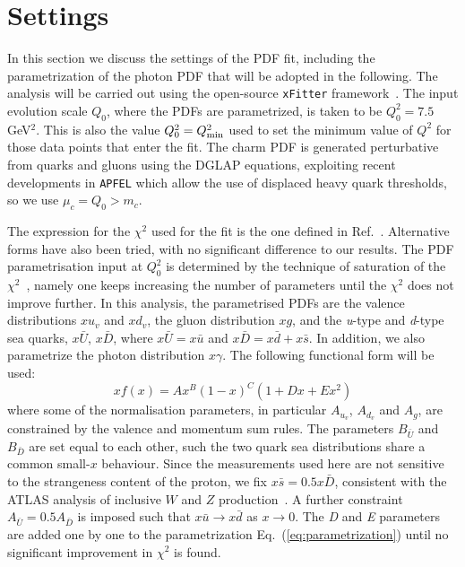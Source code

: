 \section{Settings}
\label{sec:fitsettings}

In this section we discuss the settings of
the PDF fit, including the parametrization of the photon PDF
that will be adopted in the following.
%
The analysis will be carried out using the open-source
{\tt xFitter} framework~\cite{Alekhin:2014irh}.
%
The input evolution scale $Q_0$, where the PDFs
are parametrized, is taken to be $Q^2_0 = 7.5~$GeV$^2$.
%
This is also the value $Q^2_0=Q^2_{\rm min}$ used to set the
minimum value of $Q^2$ for those data points that enter the fit.
%
The charm PDF is generated perturbative from quarks and gluons
using the DGLAP equations, exploiting recent developments
in {\tt APFEL} which allow the use of displaced heavy quark
thresholds, so we use $\mu_c=Q_0 > m_c$.

The  expression for the $\chi^2$ used for the fit is the one
defined in Ref.~\cite{h1chisqdef}.
%
Alternative forms have also been tried,
with no significant difference to our results.
% 
The PDF parametrisation input at $Q^2_0$ is determined by the technique of saturation of the $\chi^{2}$~\cite{h1chisqsat}, namely one keeps increasing
the number of parameters until the $\chi^{2}$ does not improve further.
%
In this analysis,
the parametrised PDFs are the valence distributions $xu_{v}$ and $xd_{v}$, the gluon distribution $xg$, and the \textit{u}-type and \textit{d}-type sea quarks, $x\bar{U}$, $x\bar{D}$, where $x\bar{U} = x\bar{u}$ and $x\bar{D} = x\bar{d} + x\bar{s}$.
%
In addition, we also parametrize the photon distribution $x\gamma$.
%
The following  functional form will be used:
\begin{equation}
  \label{eq:parametrization}
xf(x) = Ax^{B}(1-x)^{C}(1+Dx+Ex^{2})
\end{equation}
where some of the normalisation parameters, in particular
$A_{u_{v}}$, $A_{d_{v}}$ and $A_{g}$, are constrained by the valence and momentum
sum rules.
%
The  parameters $B_{\bar{U}}$ and $B_{\bar{D}}$ are set equal to each other, such
the two quark sea distributions share a common small-$x$ behaviour.
%
Since the measurements used here are not sensitive to the 
strangeness content of the proton, we fix $x\bar{s} = 0.5x\bar{D}$, consistent with
the ATLAS 
analysis of inclusive $W$ and $Z$ production~\cite{Aad:2012sb}.
%
A further constraint $A_{\bar{U}} = 0.5 A_{\bar{D}}$ is imposed such that $x\bar{u} \to x\bar{d}$ as $x \to 0$.
The \textit{D} and \textit{E} parameters are added one by one
to the parametrization Eq.~(\ref{eq:parametrization}) until no significant 
improvement in $\chi^{2}$ is found. 

